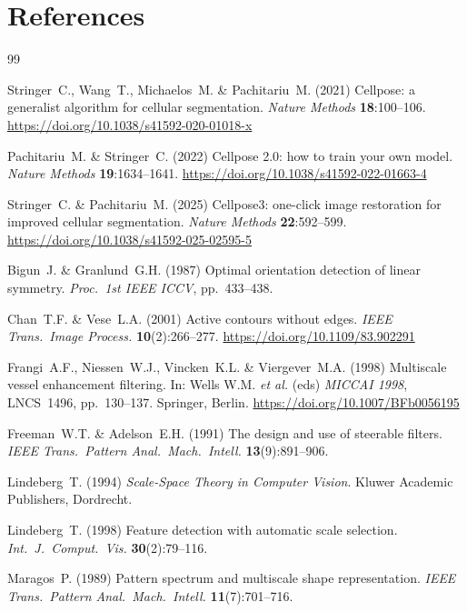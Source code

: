 \documentclass[a4paper, justified]{tufte-book}
\begin{document}
\chapter*{References}

\begin{thebibliography}{99}

Stringer~C., Wang~T., Michaelos~M. \& Pachitariu~M. (2021)
Cellpose: a generalist algorithm for cellular segmentation.
\textit{Nature Methods} \textbf{18}:100--106.
\url{https://doi.org/10.1038/s41592-020-01018-x}

Pachitariu~M. \& Stringer~C. (2022)
Cellpose 2.0: how to train your own model.
\textit{Nature Methods} \textbf{19}:1634--1641.
\url{https://doi.org/10.1038/s41592-022-01663-4}

Stringer~C. \& Pachitariu~M. (2025)
Cellpose3: one-click image restoration for improved cellular segmentation.
\textit{Nature Methods} \textbf{22}:592--599.
\url{https://doi.org/10.1038/s41592-025-02595-5}

Bigun~J. \& Granlund~G.H. (1987)
Optimal orientation detection of linear symmetry.
\textit{Proc.\ 1st IEEE ICCV}, pp.~433--438.

Chan~T.F. \& Vese~L.A. (2001)
Active contours without edges.
\textit{IEEE Trans.\ Image Process.} \textbf{10}(2):266--277.
\url{https://doi.org/10.1109/83.902291}

Frangi~A.F., Niessen~W.J., Vincken~K.L. \& Viergever~M.A. (1998)
Multiscale vessel enhancement filtering.
In: Wells W.M. \textit{et al.} (eds) \textit{MICCAI 1998},
LNCS~1496, pp.~130--137. Springer, Berlin.
\url{https://doi.org/10.1007/BFb0056195}

Freeman~W.T. \& Adelson~E.H. (1991)
The design and use of steerable filters.
\textit{IEEE Trans.\ Pattern Anal.\ Mach.\ Intell.} \textbf{13}(9):891--906.

Lindeberg~T. (1994)
\textit{Scale-Space Theory in Computer Vision}.
Kluwer Academic Publishers, Dordrecht.

Lindeberg~T. (1998)
Feature detection with automatic scale selection.
\textit{Int.\ J.\ Comput.\ Vis.} \textbf{30}(2):79--116.

Maragos~P. (1989)
Pattern spectrum and multiscale shape representation.
\textit{IEEE Trans.\ Pattern Anal.\ Mach.\ Intell.} \textbf{11}(7):701--716.


\end{thebibliography}
\end{document}
